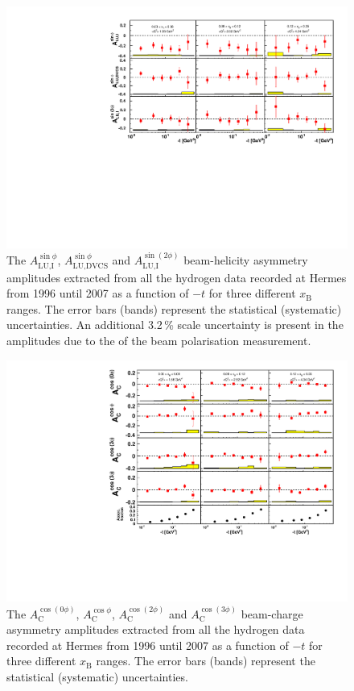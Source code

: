 \begin{figure}
 \begin{center}
 \includegraphics[width=15cm]{macros/bsa_2d_morgan}
  \caption{The $A_{\textrm{LU,I}}^{\sin\phi}$, $A_{\textrm{LU,DVCS}}^{\sin\phi}$ and
$A_{\textrm{LU,I}}^{\sin(2\phi)}$ beam-helicity asymmetry amplitudes extracted from all the hydrogen data recorded at H{\sc ermes} from 1996 until 2007 as a function of $-t$ for three different $x_{\textrm{B}}$ ranges. The error bars (bands) represent the statistical (systematic) uncertainties. An additional 3.2\,\% scale uncertainty is present in the amplitudes due to the  of the beam polarisation measurement.}
  \label{bsa_xbjrange2}
 \end{center}
\end{figure}

\begin{figure}
  \begin{center}
    \includegraphics[width=15cm]{macros/bca_2d_morgan}
    \caption{The $A_{\textrm{C}}^{\cos(0\phi)}$, $A_{\textrm{C}}^{\cos\phi}$, $A_{\textrm{C}}^{\cos(2\phi)}$ and $A_{\textrm{C}}^{\cos(3\phi)}$ beam-charge asymmetry amplitudes extracted from all the hydrogen data recorded at H{\sc ermes} from 1996 until 2007 as a function of $-t$ for three different $x_{\textrm{B}}$ ranges. The error bars (bands) represent the statistical (systematic) uncertainties.}
  \label{bca_xbjrange2}
 \end{center}
\end{figure}

